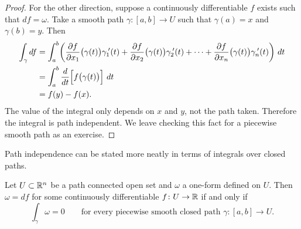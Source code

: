 \begin{proof}
For the other direction,
suppose a continuously differentiable $f$ exists such that $df = \omega$.
Take a smooth
path
$\gamma \colon [a,b] \to U$ such that $\gamma(a) = x$ and
$\gamma(b) = y$.  Then
\begin{equation*}
\begin{split}
\int_\gamma df
& =
\int_a^b
\biggl(
\frac{\partial f}{\partial x_1}\bigl(\gamma(t)\bigr) \gamma_1^{\:\prime}(t)+
\frac{\partial f}{\partial x_2}\bigl(\gamma(t)\bigr) \gamma_2^{\:\prime}(t)+ \cdots +
\frac{\partial f}{\partial x_n}\bigl(\gamma(t)\bigr) \gamma_n^{\:\prime}(t)
\biggr) ~ dt
\\
& = 
\int_a^b
\frac{d}{dt} \Bigl[ f\bigl(\gamma(t)\bigr) \Bigr]~ dt
\\
& = f(y)-f(x) .
\end{split}
\end{equation*}
The value of the integral only depends on $x$ and $y$, not the
path taken.  Therefore the integral is path independent.
We leave checking this fact for a piecewise smooth path as an exercise.
\end{proof}

Path independence can be stated more neatly in terms of integrals over
closed paths.

\begin{prop}
Let $U \subset {\mathbb{R}}^n$ be a path connected open set and $\omega$
a one-form defined on $U$.
Then $\omega = df$ for some continuously differentiable $f \colon U \to
{\mathbb{R}}$ if and only if
\begin{equation*}
\int_{\gamma} \omega = 0
\qquad
\text{for every piecewise smooth closed path } \gamma \colon [a,b] \to U.
\end{equation*}
\end{prop}

